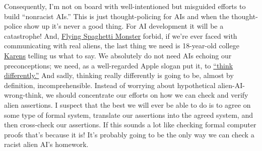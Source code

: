Consequently, I'm not on board with well-intentioned but misguided
efforts to build ``nonracist AIs.'' This is just thought-policing for
AIs and when the thought-police show up it's never a good thing. For AI
development it will be a catastrophe! And,
\href{https://www.spaghettimonster.org/}{Flying Spaghetti Monster}
forbid, if we're ever faced with communicating with real aliens, the
last thing we need is 18-year-old college
\href{https://slangit.com/meaning/karen}{Karens} telling us what to say.
We absolutely do not need AIs echoing our preconceptions; we need, as a
well-regarded Apple slogan put it, to
\href{https://genius.com/Apple-inc-think-different-ad-annotated}{``think
differently.''} And sadly, thinking really differently is going to be,
almost by definition, incomprehensible. Instead of worrying about
hypothetical alien-AI-wrong-think, we should concentrate our efforts on how
we can check and verify alien assertions. I suspect that the best we
will ever be able to do is to agree on some type of formal system,
translate our assertions into the agreed system, and then cross-check
our assertions. If this sounds a lot like checking formal computer
proofs that's because it is! It's probably going to be the only way we
can check a racist alien AI's homework.


%

